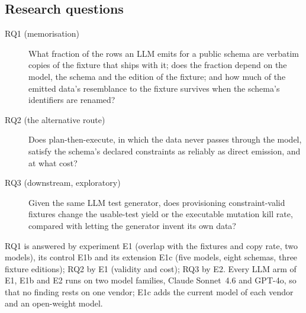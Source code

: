 \documentclass[preprint,12pt]{elsarticle}
\begin{document}
\subsection{Research questions}
\begin{description}
\item[RQ1 (memorisation)] What fraction of the rows an LLM emits for a public schema are verbatim copies of the fixture that ships with it; does the fraction depend on the model, the schema and the edition of the fixture; and how much of the emitted data's resemblance to the fixture survives when the schema's identifiers are renamed?
\item[RQ2 (the alternative route)] Does plan-then-execute, in which the data never passes through the model, satisfy the schema's declared constraints as reliably as direct emission, and at what cost?
\item[RQ3 (downstream, exploratory)] Given the same LLM test generator, does provisioning constraint-valid fixtures change the usable-test yield or the executable mutation kill rate, compared with letting the generator invent its own data?
\end{description}
RQ1 is answered by experiment E1 (overlap with the fixtures and copy rate, two models), its control E1b and its extension E1c (five models, eight schemas, three fixture editions); RQ2 by E1 (validity and cost); RQ3 by E2. Every LLM arm of E1, E1b and E2 runs on two model families, Claude Sonnet~4.6 and GPT-4o, so that no finding rests on one vendor; E1c adds the current model of each vendor and an open-weight model.
\end{document}
